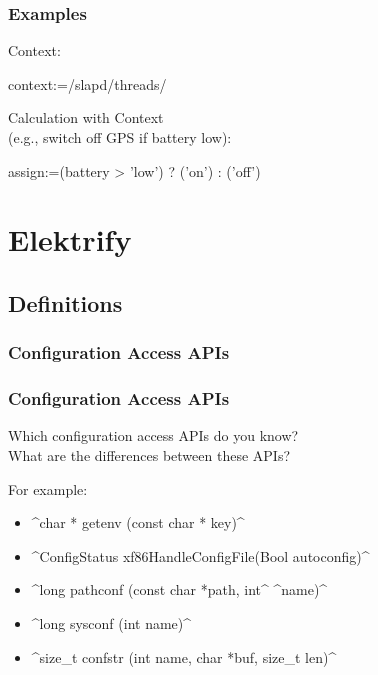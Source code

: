 \begin{frame}[fragile]
	\frametitle{Examples}
	Context:
	\begin{code}
	context:=/slapd/threads/%
	\end{code}

	\vspace{1cm}
	Calculation with Context
	\\ (e.g., switch off GPS if battery low):
	\pause
	\begin{code}
	assign:=(battery > 'low') ? ('on') : ('off')
	\end{code}
\end{frame}





\section{Elektrify}



\subsection{Definitions}

\begin{frame}
	\frametitle{Configuration Access APIs}

	\Large

\end{frame}

\begin{frame}[fragile]
	\frametitle{Configuration Access APIs}

	\begin{task}
	Which configuration access APIs do you know? \\
	What are the differences between these APIs?
	\end{task}

	For example:
	\begin{itemize}[<+-| alert@+>]
	\item ^char * getenv (const char * key)^
	\item ^ConfigStatus xf86HandleConfigFile(Bool autoconfig)^
	\item ^long pathconf (const char *path, int^ ^name)^
	\item ^long sysconf (int name)^
	\item ^size_t confstr (int name, char *buf, size_t len)^
	\end{itemize}
\end{frame}

